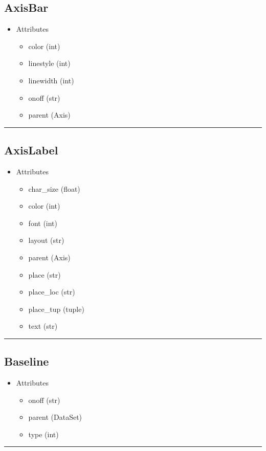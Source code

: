 \documentclass[10pt]{article}
\begin{document}
\begin{multicols}{4}
\subsection*{\footnotesize AxisBar}
\begin{itemize}
\item Attributes
\begin{itemize}
\item color (int)
\item linestyle (int)
\item linewidth (int)
\item onoff (str)
\item parent (Axis)
\end{itemize}
\end{itemize}
\vspace{0.5em}
\hrule
\vspace{0.1em}
\subsection*{\footnotesize AxisLabel}
\begin{itemize}
\item Attributes
\begin{itemize}
\item char\_size (float)
\item color (int)
\item font (int)
\item layout (str)
\item parent (Axis)
\item place (str)
\item place\_loc (str)
\item place\_tup (tuple)
\item text (str)
\end{itemize}
\end{itemize}
\vspace{0.5em}
\hrule
\vspace{0.1em}
\subsection*{\footnotesize Baseline}
\begin{itemize}
\item Attributes
\begin{itemize}
\item onoff (str)
\item parent (DataSet)
\item type (int)
\end{itemize}
\end{itemize}
\vspace{0.5em}
\hrule
\vspace{0.1em}

\end{multicols}
\end{document}

